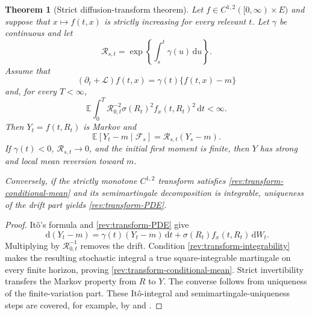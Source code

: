 \documentclass[11pt]{article}
\newtheorem{theorem}[definition]{Theorem}
\theoremstyle{remark}
\newcommand{\E}{\mathbb E}
\newcommand{\dd}{\,\mathrm d}
\begin{document}
\begin{theorem}[Strict diffusion-transform theorem]
\label{rev:thm-diffusion-transform}
Let $f\in C^{1,2}([0,\infty)\times E)$ and suppose that
$x\mapsto f(t,x)$ is strictly increasing for every relevant $t$.  Let
$\gamma$ be continuous and let
\begin{equation}
\mathcal R_{s,t}=\exp\!\left\{\int_s^t\gamma(u)\dd u\right\}.
\label{rev:R-gamma}
\end{equation}
Assume that
\begin{equation}
(\partial_t+\mathcal L)f(t,x)=\gamma(t)\{f(t,x)-m\}
\label{rev:transform-PDE}
\end{equation}
and, for every $T<\infty$,
\begin{equation}
\E\int_0^T \mathcal R_{0,t}^{-2}
\sigma(R_t)^2f_x(t,R_t)^2\dd t<\infty.
\label{rev:transform-integrability}
\end{equation}
Then $Y_t=f(t,R_t)$ is Markov and
\begin{equation}
\E[Y_t-m\mid\mathcal F_s]=\mathcal R_{s,t}(Y_s-m).
\label{rev:transform-conditional-mean}
\end{equation}
If $\gamma(t)<0$, $\mathcal R_{s,t}\to0$, and the initial first moment is finite,
then $Y$ has strong and local mean reversion toward $m$.

Conversely, if the strictly monotone $C^{1,2}$ transform satisfies
\eqref{rev:transform-conditional-mean} and its semimartingale decomposition is
integrable, uniqueness of the drift part yields \eqref{rev:transform-PDE}.
\end{theorem}

\begin{proof}
It\^o's formula and \eqref{rev:transform-PDE} give
\[
\dd(Y_t-m)=\gamma(t)(Y_t-m)\dd t
+\sigma(R_t)f_x(t,R_t)\dd W_t.
\]
Multiplying by $\mathcal R_{0,t}^{-1}$ removes the drift.  Condition
\eqref{rev:transform-integrability} makes the resulting stochastic integral a
true square-integrable martingale on every finite horizon, proving
\eqref{rev:transform-conditional-mean}.  Strict invertibility transfers the
Markov property from $R$ to $Y$.  The converse follows from uniqueness of the
finite-variation part.  These It\^o-integral and semimartingale-uniqueness steps
are covered, for example, by \citet{KaratzasShreve1991} and
\citet{Protter2005}.
\end{proof}
\end{document}
